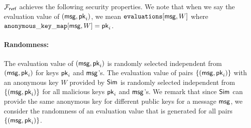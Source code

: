 	$ \mathcal{F}_{\textsf{rvrf}} $  achieves the following security properties. We note that when we say the evaluation value of $ (\mathsf{msg}, \mathsf{pk}_i) $, we mean $ \texttt{evaluations}[\mathsf{msg},W] $ where $ \mathtt{anonymous\_key\_map}[\mathsf{msg},W] = \mathsf{pk}_i $.
	
	\paragraph{Randomness:}  The evaluation value of $ (\mathsf{msg}, \mathsf{pk}_i) $ is randomly selected independent from $ (\mathsf{msg}, \mathsf{pk}_i) $ for keys $ \mathsf{pk}_i $ and $ \mathsf{msg} $'s. The evaluation value of pairs  $ \{(\mathsf{msg}, \mathsf{pk}_i)\} $  with an anonymous key $ W $ provided by $ \mathsf{Sim} $  is randomly selected independent from $ \{(\mathsf{msg}, \mathsf{pk}_i)\} $ for all malicious keys $ \mathsf{pk}_i  $ and $ \mathsf{msg} $'s. We remark that since $ \mathsf{Sim} $ can provide the same anonymous key for different public keys for a message $ \mathsf{msg} $, we  consider the randomness of an evaluation value that is generated for all pairs $ \{(\mathsf{msg}, \mathsf{pk}_i)\} $.
	
